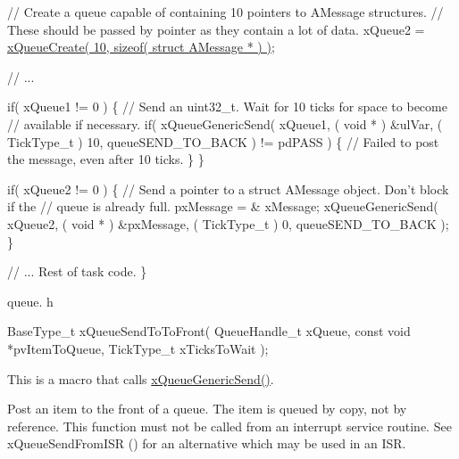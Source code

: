 \begin{DoxyPre} // Create a queue capable of containing 10 pointers to AMessage structures.
 // These should be passed by pointer as they contain a lot of data.
 xQueue2 = \hyperlink{vendor_2ceedling_2plugins_2freertos_2src_2freertos_2include_2queue_8h_aeb858b824bd74a934ea7ebb81af2a6bb}{xQueueCreate( 10, sizeof( struct AMessage * ) )};\end{DoxyPre}



\begin{DoxyPre} // ...\end{DoxyPre}



\begin{DoxyPre} if( xQueue1 != 0 )
 \{
     // Send an uint32\_t.  Wait for 10 ticks for space to become
     // available if necessary.
     if( xQueueGenericSend( xQueue1, ( void * ) \&ulVar, ( TickType\_t ) 10, queueSEND\_TO\_BACK ) != pdPASS )
     \{
         // Failed to post the message, even after 10 ticks.
     \}
 \}\end{DoxyPre}



\begin{DoxyPre} if( xQueue2 != 0 )
 \{
     // Send a pointer to a struct AMessage object.  Don't block if the
     // queue is already full.
     pxMessage = \& xMessage;
     xQueueGenericSend( xQueue2, ( void * ) \&pxMessage, ( TickType\_t ) 0, queueSEND\_TO\_BACK );
 \}\end{DoxyPre}



\begin{DoxyPre} // ... Rest of task code.
\}
\end{DoxyPre}


queue. h 
\begin{DoxyPre}
BaseType\_t xQueueSendToToFront(
                               QueueHandle\_t    xQueue,
                               const void       *pvItemToQueue,
                               TickType\_t       xTicksToWait
                           );
  \end{DoxyPre}


This is a macro that calls \hyperlink{externals_2freertos_2include_2queue_8h_a7ce86d1026e0c3055a523935bf53c0b3}{x\+Queue\+Generic\+Send()}.

Post an item to the front of a queue. The item is queued by copy, not by reference. This function must not be called from an interrupt service routine. See x\+Queue\+Send\+From\+I\+SR () for an alternative which may be used in an I\+SR.


